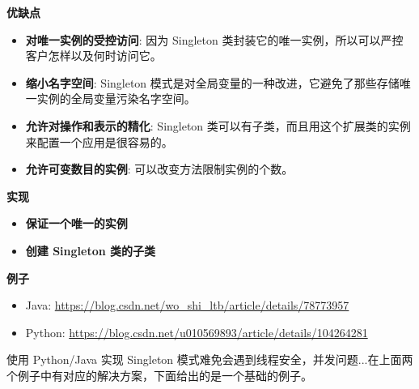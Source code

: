 \noindent\textbf{优缺点}
\begin{itemize}
    \item \textbf{对唯一实例的受控访问}: 因为 Singleton 类封装它的唯一实例，所以可以严控客户怎样以及何时访问它。
    \item \textbf{缩小名字空间}: Singleton 模式是对全局变量的一种改进，它避免了那些存储唯一实例的全局变量污染名字空间。
    \item \textbf{允许对操作和表示的精化}: Singleton 类可以有子类，而且用这个扩展类的实例来配置一个应用是很容易的。
    \item \textbf{允许可变数目的实例}: 可以改变方法限制实例的个数。
\end{itemize}

\noindent\textbf{实现}

\begin{itemize}
    \item \textbf{保证一个唯一的实例}
    \item \textbf{创建 Singleton 类的子类}
\end{itemize}

\noindent\textbf{例子}

\begin{itemize}
    \item Java: \url{https://blog.csdn.net/wo_shi_ltb/article/details/78773957}
    \item Python: \url{https://blog.csdn.net/u010569893/article/details/104264281}
\end{itemize}

使用 Python/Java 实现 Singleton 模式难免会遇到线程安全，并发问题...在上面两个例子中有对应的解决方案，下面给出的是一个基础的例子。



\newpage